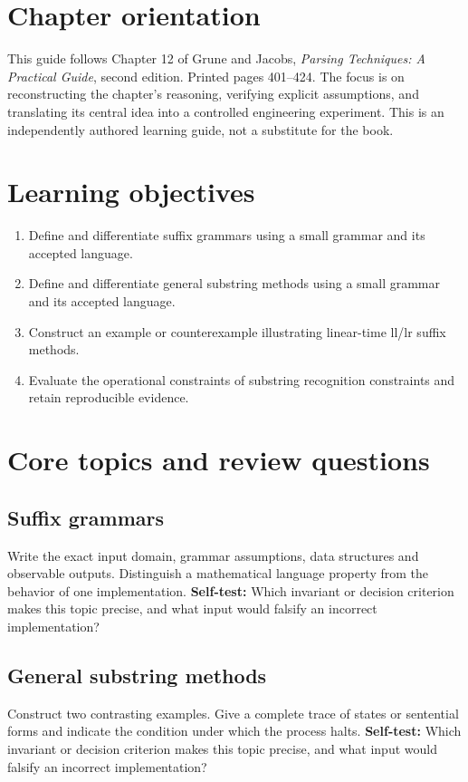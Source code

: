 \documentclass[11pt,letterpaper]{article}
\begin{document}
\makedoctitle\makedocsummary
\tableofcontents\clearpage
\section{Chapter orientation}
This guide follows Chapter 12 of Grune and Jacobs, \emph{Parsing Techniques: A Practical Guide}, second edition. Printed pages 401--424. The focus is on reconstructing the chapter's reasoning, verifying explicit assumptions, and translating its central idea into a controlled engineering experiment. This is an independently authored learning guide, not a substitute for the book.
\section{Learning objectives}
\begin{enumerate}
\item Define and differentiate suffix grammars using a small grammar and its accepted language.
\item Define and differentiate general substring methods using a small grammar and its accepted language.
\item Construct an example or counterexample illustrating linear-time ll/lr suffix methods.
\item Evaluate the operational constraints of substring recognition constraints and retain reproducible evidence.
\end{enumerate}
\section{Core topics and review questions}
\subsection{Suffix grammars}
Write the exact input domain, grammar assumptions, data structures and observable outputs. Distinguish a mathematical language property from the behavior of one implementation.
\textbf{Self-test:} Which invariant or decision criterion makes this topic precise, and what input would falsify an incorrect implementation?
\subsection{General substring methods}
Construct two contrasting examples. Give a complete trace of states or sentential forms and indicate the condition under which the process halts.
\textbf{Self-test:} Which invariant or decision criterion makes this topic precise, and what input would falsify an incorrect implementation?
\end{document}
